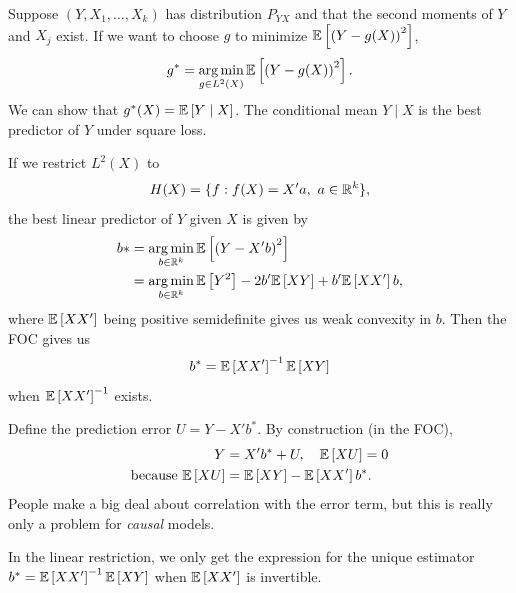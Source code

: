 \begin{example}	Suppose $(Y,X_1,\ldots,X_k)$ has distribution $P_{YX}$ and that the second moments of $Y$ and $X_j$ exist. If we want to choose $g$ to minimize $\mathbb{E}\left[\left( Y - g(X) \right)^2\right] $, \[
		g^* = \operatorname*{arg\,min}_{g \in L^2(X)} \mathbb{E}\left[\left( Y - g(X) \right)^2\right]
		.\] We can show that $g^*(X) = \mathbb{E}\left[Y \mid X\right]$. The conditional mean $Y \mid X$ is the best predictor of $Y$ under square loss.

	If we restrict $L^2(X)$ to \[
		H(X) = \{f: f(X) = X'a,\ a \in \mathbb{R}^k\}
		,\] the best linear predictor of $Y$ given $X$ is given by \begin{align*}
		b* & = \operatorname*{arg\,min}_{b \in \mathbb{R}^k} \mathbb{E}\left[\left( Y-X'b \right)^2	\right] \\
		   & = \operatorname*{arg\,min}_{b \in \mathbb{R}^k} \mathbb{E}\left[Y^2\right]  - 2b' \mathbb{E}\left[XY\right]  + b' \mathbb{E}\left[XX'\right] b
		,\end{align*}
	where $\mathbb{E}\left[XX'\right] $ being positive semidefinite gives us weak convexity in $b$.
	Then the FOC gives us \[
		b^* = \mathbb{E}\left[XX'\right] ^{-1}\mathbb{E}\left[XY\right]
	\]
	when $\mathbb{E}\left[XX'\right] ^{-1}$ exists.

	Define the prediction error $U = Y-X'b^*$. By construction (in the FOC),
	\begin{align*}
		Y                                 & = X' b^* + U, \quad \mathbb{E}\left[XU\right] = 0     \\
		\text{because } \mathbb{E}\left[XU\right] & = \mathbb{E}\left[XY\right]  - \mathbb{E}\left[XX'\right] b^*
		.\end{align*}
	People make a big deal about correlation with the error term, but this is really only a problem for \emph{causal} models.
\end{example}

In the linear restriction, we only get the expression for the unique estimator $b^* = \mathbb{E}\left[XX'\right] ^{-1} \mathbb{E}\left[XY\right] $ when $\mathbb{E}\left[XX'\right] $ is invertible.

